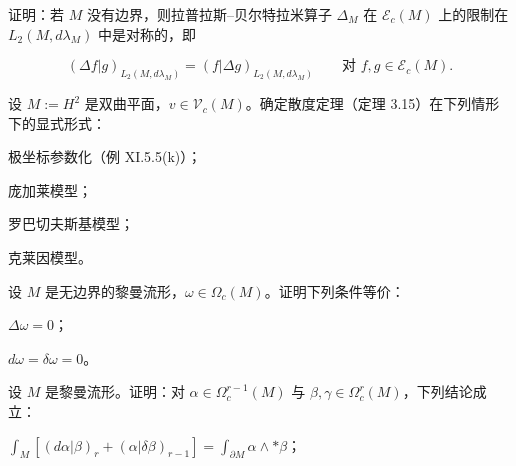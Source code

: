 \begin{exercises}
\begin{items}
\end{items}

\item

证明：若 $ M $ 没有边界，则拉普拉斯–贝尔特拉米算子 $ \Delta_M $ 在 $ \mathcal{E}_c(M) $ 上的限制在 $ L_2(M,d\lambda_M) $ 中是对称的，即

\[
(\Delta f|g)_{L_2(M,d\lambda_M)} = (f|\Delta g)_{L_2(M,d\lambda_M)} \qquad \text{对 } f,g \in \mathcal{E}_c(M).
\]
\item

设 $ M := H^2 $ 是双曲平面，$ v \in \mathcal{V}_c(M) $。确定散度定理（定理 3.15）在下列情形下的显式形式：

\begin{items}
\item

极坐标参数化（例 XI.5.5(k)）；

\item

庞加莱模型；

\item

罗巴切夫斯基模型；

\item

克莱因模型。

\end{items}

\item

设 $ M $ 是无边界的黎曼流形，$ \omega \in \Omega_c(M) $。证明下列条件等价：

\begin{subitems}
\item

$ \Delta\omega = 0 $；

\item

$ d\omega = \delta\omega = 0 $。

\end{subitems}

\item

设 $ M $ 是黎曼流形。证明：对 $ \alpha \in \Omega_c^{r-1}(M) $ 与 $ \beta,\gamma \in \Omega_c^r(M) $，下列结论成立：

\begin{subitems}
\item

$ \int_M[(d\alpha|\beta)_r + (\alpha|\delta\beta)_{r-1}] = \int_{\partial M}\alpha\wedge\ast\beta $；


\end{subitems}
\end{exercises}
